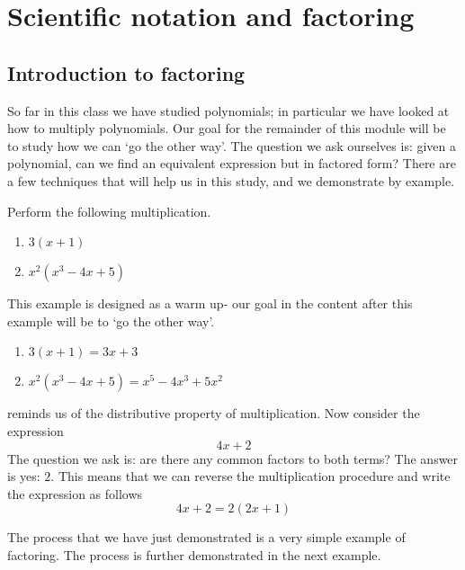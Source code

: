 \chapter{Scientific notation and factoring}
\minitoc

\section{Introduction to factoring}
%
So far in this class we have studied polynomials; in particular we have looked at how to multiply
polynomials. Our goal for the remainder of this module will be to study how we can `go the other way'. The question we ask ourselves is: given a
\gls{polynomial}, can we find an equivalent \gls{expression} but in factored form? There are a few techniques that
will help us in this study, and we demonstrate by example.

\begin{myexample}\label{ex:motivationfacto}
Perform the following multiplication.
\begin{multicols}{2}
	\begin{enumerate}
		\item $3(x+1)$
		\item $x^2(x^3-4x+5)$
	\end{enumerate} 
\end{multicols}
\end{myexample}
\begin{myProof}
	This example is designed as a warm up- our goal in the content after 
	this example will be to `go the other way'.
	\begin{enumerate}
		\item $3(x+1) = 3x+3$
		\item $x^2(x^3-4x+5) = x^5-4x^3+5x^2$
	\end{enumerate} 
\end{myProof} 

 reminds us of the distributive property
of multiplication. Now consider the expression
\[
	4x+2
\]
The question we ask is: are there any common factors to both terms? The
answer is yes: $2$. This means that we can reverse the multiplication procedure
and write the expression as follows
\[
	4x+2 = 2(2x+1)
\]

The process that we have just demonstrated is a very simple example of factoring. The process
is further demonstrated in the next example.

